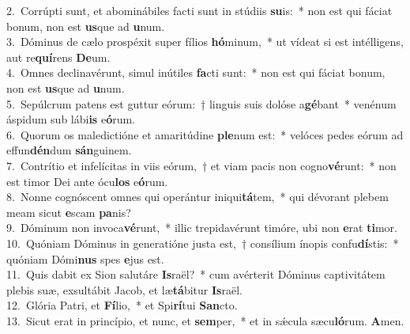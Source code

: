 {2.~}Corrúpti sunt, et abominábiles facti sunt in stúdiis \textbf{su}is:~* non est qui fáciat bonum, non est \textbf{us}que ad \textbf{u}num.\\
{3.~}Dóminus de cælo prospéxit super fílios \textbf{hó}minum,~* ut vídeat si est intélligens, aut re\textbf{quí}rens \textbf{De}um.\\
{4.~}Omnes declinavérunt, simul inútiles \textbf{fa}cti sunt:~* non est qui fáciat bonum, non est \textbf{us}que ad \textbf{u}num.\\
{5.~}Sepúlcrum patens est guttur eórum:~† linguis suis dolóse a\textbf{gé}bant~* venénum áspidum sub lábi\textbf{is} e\textbf{ó}rum.\\
{6.~}Quorum os maledictióne et amaritúdine \textbf{ple}num est:~* velóces pedes eórum ad effun\textbf{dén}dum \textbf{sán}guinem.\\
{7.~}Contrítio et infelícitas in viis eórum,~† et viam pacis non cogno\textbf{vé}runt:~* non est timor Dei ante ócu\textbf{los} e\textbf{ó}rum.\\
{8.~}Nonne cognóscent omnes qui operántur iniqui\textbf{tá}tem,~* qui dévorant plebem meam sicut \textbf{e}scam \textbf{pa}nis?\\
{9.~}Dóminum non invoca\textbf{vé}runt,~* illic trepidavérunt timóre, ubi non \textbf{e}rat \textbf{ti}mor.\\
{10.~}Quóniam Dóminus in generatióne justa est,~† consílium ínopis confu\textbf{dí}stis:~* quóniam Dómi\textbf{nus} spes \textbf{e}jus est.\\
{11.~}Quis dabit ex Sion salutáre \textbf{Is}raël?~* cum avérterit Dóminus captivitátem plebis suæ, exsultábit Jacob, et læ\textbf{tá}bitur \textbf{Is}raël.\\
{12.~}Glória Patri, et \textbf{Fí}lio,~* et Spi\textbf{rí}tui \textbf{San}cto.\\
{13.~}Sicut erat in princípio, et nunc, et \textbf{sem}per,~* et in sǽcula sæcu\textbf{ló}rum. \textbf{A}men.\\

